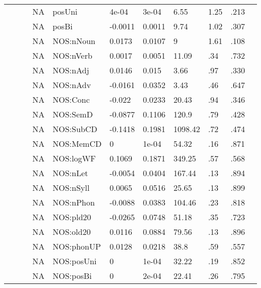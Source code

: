 \begin{table}[ht]
\begin{tabular}{lllllllllll}
   &  &  & NA & posUni & 4e-04 & 3e-04 & 6.55 & 1.25 & .213 &   \\ 
   &  &  & NA & posBi & -0.0011 & 0.0011 & 9.74 & 1.02 & .307 &   \\ 
   &  &  & NA & NOS:nNoun & 0.0173 & 0.0107 & 9 & 1.61 & .108 &   \\ 
   &  &  & NA & NOS:nVerb & 0.0017 & 0.0051 & 11.09 & .34 & .732 &   \\ 
   &  &  & NA & NOS:nAdj & 0.0146 & 0.015 & 3.66 & .97 & .330 &   \\ 
   &  &  & NA & NOS:nAdv & -0.0161 & 0.0352 & 3.43 & .46 & .647 &   \\ 
   &  &  & NA & NOS:Conc & -0.022 & 0.0233 & 20.43 & .94 & .346 &   \\ 
   &  &  & NA & NOS:SemD & -0.0877 & 0.1106 & 120.9 & .79 & .428 &   \\ 
   &  &  & NA & NOS:SubCD & -0.1418 & 0.1981 & 1098.42 & .72 & .474 &   \\ 
   &  &  & NA & NOS:MemCD & 0 & 1e-04 & 54.32 & .16 & .871 &   \\ 
   &  &  & NA & NOS:logWF & 0.1069 & 0.1871 & 349.25 & .57 & .568 &   \\ 
   &  &  & NA & NOS:nLet & -0.0054 & 0.0404 & 167.44 & .13 & .894 &   \\ 
   &  &  & NA & NOS:nSyll & 0.0065 & 0.0516 & 25.65 & .13 & .899 &   \\ 
   &  &  & NA & NOS:nPhon & -0.0088 & 0.0383 & 104.46 & .23 & .818 &   \\ 
   &  &  & NA & NOS:pld20 & -0.0265 & 0.0748 & 51.18 & .35 & .723 &   \\ 
   &  &  & NA & NOS:old20 & 0.0116 & 0.0884 & 79.56 & .13 & .896 &   \\ 
   &  &  & NA & NOS:phonUP & 0.0128 & 0.0218 & 38.8 & .59 & .557 &   \\ 
   &  &  & NA & NOS:posUni & 0 & 1e-04 & 32.22 & .19 & .852 &   \\ 
   &  &  & NA & NOS:posBi & 0 & 2e-04 & 22.41 & .26 & .795 &   \\ 
   \hline
\end{tabular}
\endgroup
\end{table}
